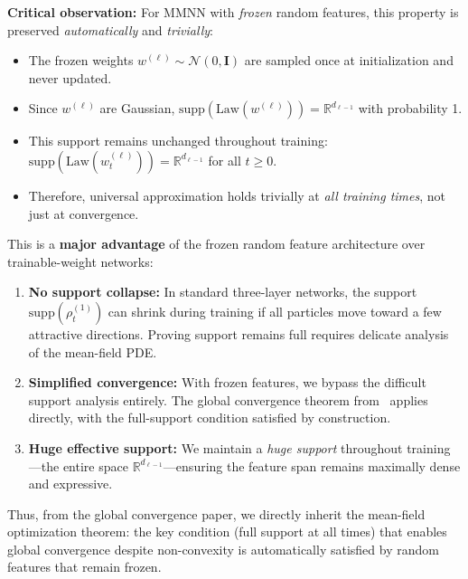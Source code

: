 \documentclass{article}
\begin{document}
\textbf{Critical observation:} For MMNN with \emph{frozen} random features, this property is preserved \emph{automatically} and \emph{trivially}:
\begin{itemize}
    \item The frozen weights \( w^{(\ell)} \sim \mathcal{N}(0, \mathbf{I}) \) are sampled once at initialization and never updated.
    \item Since \( w^{(\ell)} \) are Gaussian, \( \text{supp}(\text{Law}(w^{(\ell)})) = \mathbb{R}^{d_{\ell-1}} \) with probability 1.
    \item This support remains unchanged throughout training: \( \text{supp}(\text{Law}(w^{(\ell)}_t)) = \mathbb{R}^{d_{\ell-1}} \) for all \( t \geq 0 \).
    \item Therefore, universal approximation holds trivially at \emph{all training times}, not just at convergence.
\end{itemize}

This is a \textbf{major advantage} of the frozen random feature architecture over trainable-weight networks:
\begin{enumerate}
    \item \textbf{No support collapse:} In standard three-layer networks, the support \( \text{supp}(\rho_t^{(1)}) \) can shrink during training if all particles move toward a few attractive directions. Proving support remains full requires delicate analysis of the mean-field PDE.
    \item \textbf{Simplified convergence:} With frozen features, we bypass the difficult support analysis entirely. The global convergence theorem from~\cite{nguyen2021proof} applies directly, with the full-support condition satisfied by construction.
    \item \textbf{Huge effective support:} We maintain a \emph{huge support} throughout training—the entire space \( \mathbb{R}^{d_{\ell-1}} \)—ensuring the feature span remains maximally dense and expressive.
\end{enumerate}

Thus, from the global convergence paper, we directly inherit the mean-field optimization theorem: the key condition (full support at all times) that enables global convergence despite non-convexity is automatically satisfied by random features that remain frozen.

\vspace{1em}
\end{document}
